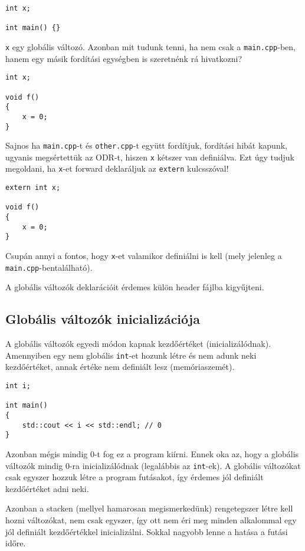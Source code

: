 \documentclass[a4paper,11.5pt,table]{article}
\begin{document}
	\begin{lstlisting}
int x;

int main() {}
	\end{lstlisting}
	\texttt{x} egy globális változó. Azonban mit tudunk tenni, ha nem csak a \texttt{main.cpp}-ben, hanem egy másik fordítási egységben is szeretnénk rá hivatkozni?
	\medskip
	
	\begin{lstlisting}
int x;

void f() 
{
	x = 0;
}
	\end{lstlisting}
  Sajnos ha \texttt{main.cpp}-t és \texttt{other.cpp}-t együtt fordítjuk, fordítási hibát kapunk, ugyanis megsértettük az ODR-t, hiszen \texttt{x} kétszer van definiálva. Ezt úgy tudjuk megoldani, ha \texttt{x}-et forward deklaráljuk az \texttt{extern} kulcsszóval!
	\medskip
	
	\begin{lstlisting}
extern int x;

void f() 
{
	x = 0;
}
	\end{lstlisting}
	Csupán annyi a fontos, hogy \texttt{x}-et valamikor definiálni is kell (mely jelenleg a \texttt{main.cpp}-bentalálható).
	\begin{note}
		A globális változók deklarációit érdemes külön header fájlba kigyűjteni.
	\end{note}
	\subsection{Globális változók inicializációja}
	A globális változók egyedi módon kapnak kezdőértéket (inicializálódnak). Amennyiben egy nem globális \texttt{int}-et hozunk létre és nem adunk neki kezdőértéket, annak értéke nem definiált lesz (memóriaszemét).
	\begin{lstlisting}
int i;

int main() 
{
	std::cout << i << std::endl; // 0
}
	\end{lstlisting}   
	Azonban mégis mindig 0-t fog ez a program kiírni. Ennek oka az, hogy a globális változók mindig 0-ra inicializálódnak (legalábbis az \texttt{int}-ek). A globális változókat csak egyszer hozzuk létre a program futásakot, így érdemes jól definiált kezdőértéket adni neki.
	
	Azonban a stacken (mellyel hamarosan megismerkedünk) rengetegszer létre kell hozni változókat, nem csak egyszer, így ott nem éri meg minden alkalommal egy jól definiált kezdőértékkel inicializálni. Sokkal nagyobb lenne a hatása a futási időre.
	
\end{document}
